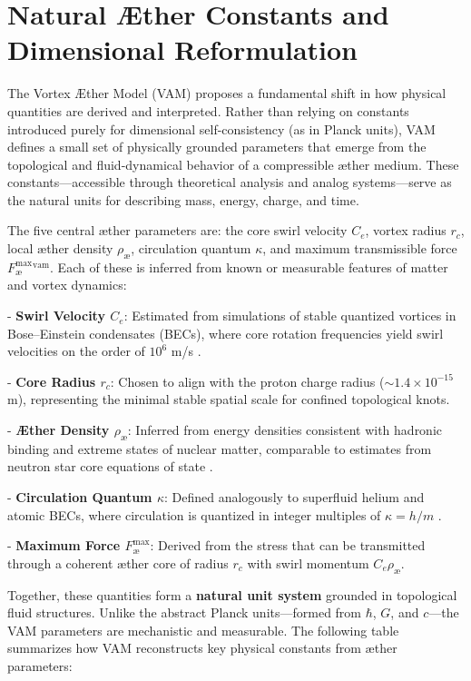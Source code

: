 \section{Natural Æther Constants and Dimensional Reformulation}

The Vortex Æther Model (VAM) proposes a fundamental shift in how physical quantities are derived and interpreted. Rather than relying on constants introduced purely for dimensional self-consistency (as in Planck units), VAM defines a small set of physically grounded parameters that emerge from the topological and fluid-dynamical behavior of a compressible æther medium. These constants—accessible through theoretical analysis and analog systems—serve as the natural units for describing mass, energy, charge, and time.

The five central æther parameters are: the core swirl velocity $C_e$, vortex radius $r_c$, local æther density $\rho_\text{\ae}$, circulation quantum $\kappa$, and maximum transmissible force $F^{\text{max}}_{\text{\ae}}^{\text{vam}}$. Each of these is inferred from known or measurable features of matter and vortex dynamics:

- \textbf{Swirl Velocity $C_e$}: Estimated from simulations of stable quantized vortices in Bose–Einstein condensates (BECs), where core rotation frequencies yield swirl velocities on the order of $10^6$ m/s \cite{Pethick2008BEC, Kleckner2013KnottedVortices}.

- \textbf{Core Radius $r_c$}: Chosen to align with the proton charge radius ($\sim 1.4 \times 10^{-15}$ m), representing the minimal stable spatial scale for confined topological knots.

- \textbf{Æther Density $\rho_\text{\ae}$}: Inferred from energy densities consistent with hadronic binding and extreme states of nuclear matter, comparable to estimates from neutron star core equations of state \cite{Lattimer2016EOS}.

- \textbf{Circulation Quantum $\kappa$}: Defined analogously to superfluid helium and atomic BECs, where circulation is quantized in integer multiples of $\kappa = h/m$ \cite{Donnelly1991QuantizedVortices}.

- \textbf{Maximum Force $F^{\text{max}}_{\text{\ae}}$}: Derived from the stress that can be transmitted through a coherent æther core of radius $r_c$ with swirl momentum $C_e \rho_\text{\ae}$.

Together, these quantities form a \textbf{natural unit system} grounded in topological fluid structures. Unlike the abstract Planck units—formed from $\hbar$, $G$, and $c$—the VAM parameters are mechanistic and measurable. The following table summarizes how VAM reconstructs key physical constants from æther parameters:

